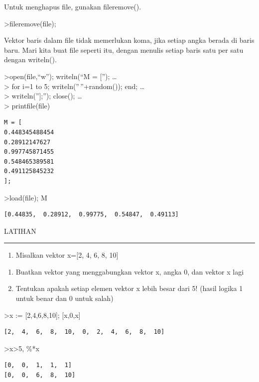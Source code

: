 \documentclass[
]{book}
\providecommand{\tightlist}{%
  \setlength{\itemsep}{0pt}\setlength{\parskip}{0pt}}
\begin{document}
Untuk menghapus file, gunakan fileremove().

\textgreater fileremove(file);

Vektor baris dalam file tidak memerlukan koma, jika setiap angka berada di baris baru. Mari kita buat file seperti itu, dengan menulis setiap baris satu per satu dengan writeln().

\textgreater open(file,``w''); writeln(``M = {[}''); \ldots{}\\
\textgreater{} for i=1 to 5; writeln(''\,''+random()); end; \ldots{}\\
\textgreater{} writeln(''{]};''); close(); \ldots{}\\
\textgreater{} printfile(file)

\begin{verbatim}
M = [
0.448345488454
0.28912147627
0.997745871455
0.548465389581
0.491125845232
];
\end{verbatim}

\textgreater load(file); M

\begin{verbatim}
[0.44835,  0.28912,  0.99775,  0.54847,  0.49113]
\end{verbatim}

LATIHAN

\begin{center}\rule{0.5\linewidth}{0.5pt}\end{center}

\begin{enumerate}
\def\labelenumi{\arabic{enumi}.}
\tightlist
\item
  Misalkan vektor x={[}2, 4, 6, 8, 10{]}
\end{enumerate}

\begin{enumerate}
\def\labelenumi{\alph{enumi}.}
\item
  Buatkan vektor yang menggabungkan vektor x, angka 0, dan vektor x lagi
\item
  Tentukan apakah setiap elemen vektor x lebih besar dari 5! (hasil logika 1 untuk benar dan 0 untuk salah)
\end{enumerate}

\textgreater x := {[}2,4,6,8,10{]}; {[}x,0,x{]}

\begin{verbatim}
[2,  4,  6,  8,  10,  0,  2,  4,  6,  8,  10]
\end{verbatim}

\textgreater x\textgreater5, \%*x

\begin{verbatim}
[0,  0,  1,  1,  1]
[0,  0,  6,  8,  10]
\end{verbatim}
\end{document}
